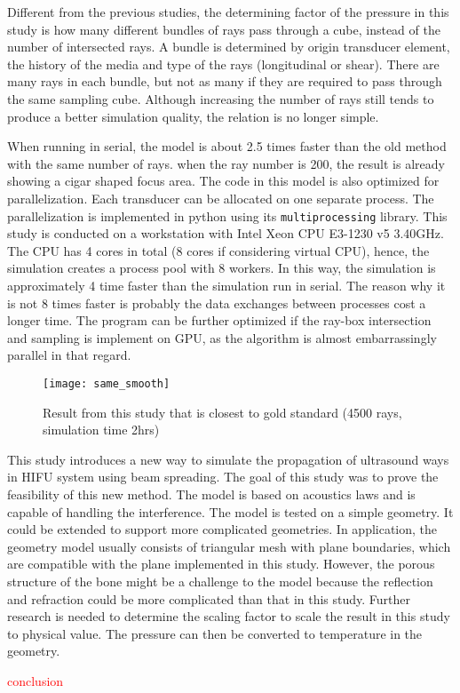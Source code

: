 
Different from the previous studies, the determining factor of the pressure in this study is how many different bundles of rays pass through a cube, instead of the number of intersected rays. A bundle is determined by origin transducer element, the history of the media and type of the rays (longitudinal or shear). There are many rays in each bundle, but not as many if they are required to pass through the same sampling cube. Although increasing the number of rays still tends to produce a better simulation quality, the relation is no longer simple.

When running in serial, the model is about 2.5 times faster than the old method with the same number of rays. when the ray number is 200, the result is already showing a cigar shaped focus area. The code in this model is also optimized for parallelization. Each transducer can be allocated on one separate process. The parallelization is implemented in python using its \texttt{multiprocessing} library. This study is conducted on a workstation with Intel\text{\textregistered} Xeon\text{\textregistered} CPU E3-1230 v5 3.40GHz. The CPU has 4 cores in total (8 cores if considering virtual CPU), hence, the simulation creates a process pool with 8 workers. In this way, the simulation is approximately 4 time faster than the simulation run in serial. The reason why it is not 8 times faster is probably the data exchanges between processes cost a longer time. The program can be further optimized if the ray-box intersection and sampling is implement on GPU, as the algorithm is almost embarrassingly parallel in that regard.

\begin{figure}[h]
    \centering
    \texttt{[image: same\_smooth]}
    \caption{Result from this study that is closest to gold standard (4500 rays, simulation time 2hrs)}
    \label{fig:same_smooth}
\end{figure}

This study introduces a new way to simulate the propagation of ultrasound ways in HIFU system using beam spreading. The goal of this study was to prove the feasibility of this new method. The model is based on acoustics laws and is capable of handling the interference. The model is tested on a simple geometry. It could be extended to support more complicated geometries. In application, the geometry model usually consists of triangular mesh with plane boundaries, which are compatible with the plane implemented in this study. However, the porous structure of the bone might be a challenge to the model \cite{vanwijk2013} because the reflection and refraction could be more complicated than that in this study. Further research is needed to determine the scaling factor to scale the result in this study to physical value. The pressure can then be converted to temperature in the geometry.

\textcolor{red}{conclusion}
